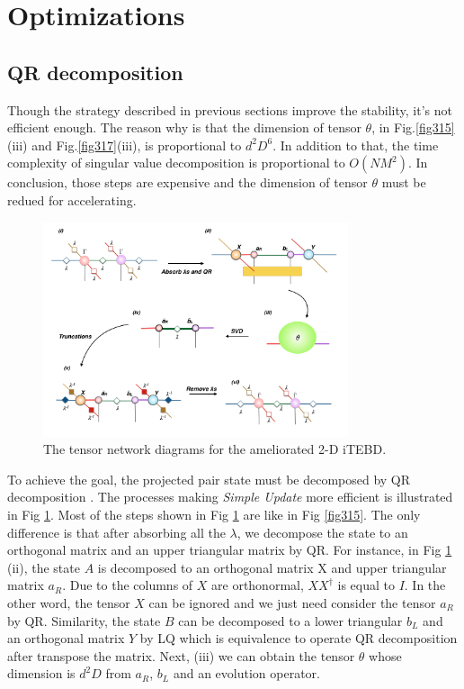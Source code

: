 \section{Optimizations}
\label{2dopt}
\subsection{QR decomposition}
Though the strategy described in previous sections improve the stability, it's not efficient enough. The reason why is that the dimension of tensor $\theta$, in Fig.\ref{fig315}(iii) and Fig.\ref{fig317}(iii), is proportional to $d^2D^6$. In addition to that, the time complexity of singular value decomposition is proportional to $O(NM^2)$. In conclusion, those steps are expensive and the dimension of tensor $\theta$ must be redued for accelerating. 
\label{2doptQR} \begin{figure}[H] \centering \includegraphics[width=0.80\textwidth]{figures/fig318.png} \caption[The tensor network diagrams for the ameliorated 2-D iTEBD with QR decompositiont]{The tensor network diagrams for the ameliorated 2-D iTEBD.} \label{fig318} \end{figure} To achieve the goal, the projected pair state must be decomposed by QR decomposition \cite{li_efficient_2012} \cite{yang_accelerated_2007}. The processes making \textit{Simple Update} more efficient is illustrated in Fig \ref{fig318}.  Most of the steps shown in Fig \ref{fig318} are like in Fig \ref{fig315}. The only difference is that after absorbing all the $\lambda$, we decompose the state to an orthogonal matrix and an upper triangular matrix by QR. For instance, in Fig \ref{fig318} (ii), the state $A$ is decomposed to an orthogonal matrix X and upper triangular matrix $a_R$. Due to the columns of $X$ are orthonormal, $XX^{\dagger}$ is equal to $I$. In the other word, the tensor $X$ can be ignored and we just need consider the tensor $a_R$ by QR. Similarity, the state $B$ can be decomposed to a lower triangular $b_L$ and an orthogonal matrix $Y$ by LQ which is equivalence to operate QR decomposition after transpose the matrix. Next, (iii) we can obtain the tensor $\theta$ whose dimension is $d^2D$ from $a_R$, $b_L$ and an evolution operator.


